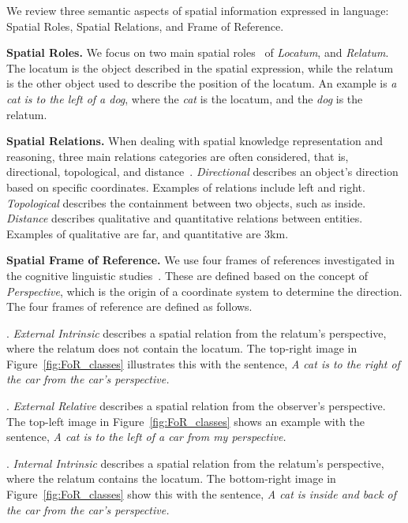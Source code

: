 We review three semantic aspects of spatial information expressed in language: Spatial Roles, Spatial Relations, and Frame of Reference.  

\noindent\textbf{Spatial Roles.} 
We focus on two main spatial roles~\citep{kordjamshidi-etal-2010-spatial} of \textit{Locatum}, and \textit{Relatum}. 
The locatum is the object described in the spatial expression, while the relatum is the other object used to describe the position of the locatum. 
An example is \textit{a cat is to the left of a dog}, where the \textit{cat} is the locatum, and the \textit{dog} is the relatum.

\noindent\textbf{Spatial Relations.} 
When dealing with spatial knowledge representation and reasoning, three main relations categories are often considered, that is, directional, topological, and distance~\citep{reasoningQualitaiveDaniel, COHN2008551,ACMpaper}. 
\textit{Directional} describes an object's direction based on specific coordinates. Examples of relations include left and right.
\textit{Topological} describes the containment between two objects, such as inside.
\textit{Distance} describes qualitative and quantitative relations between entities. Examples of qualitative are far, and quantitative are 3km.

\noindent\textbf{Spatial Frame of Reference.} We use four frames of references investigated in the cognitive linguistic studies~\cite{TENBRINK2011704}. These are defined based on the concept of \textit{Perspective}, which is the origin of a coordinate system to determine the direction. The four frames of reference are defined as follows.

. \textit{External Intrinsic} describes a spatial relation from the relatum's perspective, where the relatum does not contain the locatum. The top-right image in Figure~\ref{fig:FoR_classes} illustrates this with the sentence, \textit{A cat is to the right of the car from the car's perspective.}

. \textit{External Relative} describes a spatial relation from the observer's perspective.
The top-left image in Figure~\ref{fig:FoR_classes}  shows an example with the sentence, \textit{A cat is to the left of a car from my perspective.}

. \textit{Internal Intrinsic} describes a spatial relation from the relatum's perspective, where the relatum contains the locatum. The bottom-right image in Figure~\ref{fig:FoR_classes} show this with the sentence, \textit{A cat is inside and back of the car from the car's perspective.}

